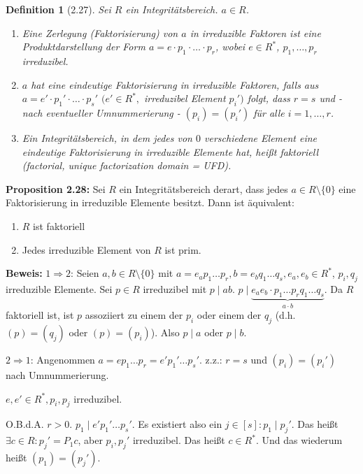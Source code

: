 \documentclass[10pt,a4paper]{article}
\newtheorem{defi}{Definition}
\begin{document}
\begin{defi}[2.27]
Sei $R$ ein Integritätsbereich. $a \in R$.\begin{enumerate}
\item Eine \emph{Zerlegung (Faktorisierung) von $a$ in irreduzible Faktoren} ist eine Produktdarstellung der Form $a = e \cdot p_1 \cdot \dots \cdot p_r$, wobei $e \in R^*$, $p_1, \dots, p_r$ irreduzibel.

\item $a$ hat eine \emph{eindeutige} Faktorisierung in irreduzible Faktoren, falls aus $a = e' \cdot p_1' \cdot \dots \cdot p_s'$ $(e' \in R^*,$ irreduzibel Element $p_i')$ folgt, dass $r =s$ und - nach eventueller Umnummerierung - $(p_i) = (p_i')$ für alle $i = 1, \dots, r$.

\item Ein Integritätsbereich, in dem jedes von $0$ verschiedene Element eine \emph{eindeutige} Faktorisierung in irreduzible Elemente hat, heißt \emph{faktoriell} (factorial, unique factorization domain = UFD).
\end{enumerate}
\end{defi}

\textbf{Proposition 2.28:} Sei $R$ ein Integritätsbereich derart, dass jedes $a \in R \setminus \{0\}$ eine Faktorisierung in irreduzible Elemente besitzt. Dann ist äquivalent:

\begin{enumerate}
\item $R$ ist faktoriell 
\item Jedes irreduzible Element von $R$ ist prim.
\end{enumerate}

\textbf{Beweis:} \glqq $1 \Rightarrow 2$\grqq : Seien $a,b \in R \setminus \{0\}$ mit $a = e_a p_1 \dots p_r, b = e_b q_1 \dots q_s, e_a, e_b \in R^*$, $p_i, q_j$ irreduzible Elemente. Sei $p \in R$ irreduzibel mit $p \mid ab$. $p \mid \underbrace{e_a e_b \cdot p_1 \dots p_r q_1 \dots q_s}_{a \cdot b}$. Da $R$ faktoriell ist, ist $p$ assoziiert zu einem der $p_i$ oder einem der $q_j$ (d.h. $(p) = (q_j)$ oder $(p) = (p_i)$). Also $p \mid a$ oder $p \mid b$.

\glqq $2 \Rightarrow 1$\grqq : Angenommen $a = e p_1 \dots p_r = e' p_1' \dots p_s'$. z.z.: $r =s$ und $(p_i) = (p_i')$ nach Umnummerierung.

$e, e' \in R^*, p_i, p_j$ irreduzibel.

O.B.d.A. $r > 0$. $p_1 \mid e' p_1' \dots p_s'$. Es existiert also ein $j \in [s]: p_1 \mid p_j'$. Das heißt $\exists c \in R: p_j' = P_1 c$, aber $p_i, p_j'$ irreduzibel. Das heißt $c \in R^*$. Und das wiederum heißt $(p_1) = (p_j')$.
\end{document}
